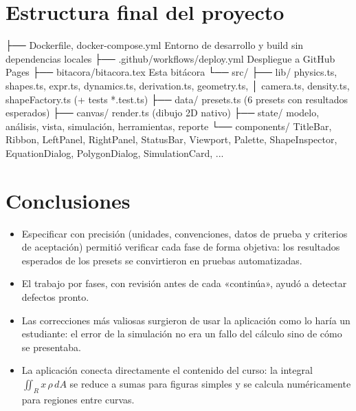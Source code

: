 \documentclass[11pt,a4paper]{article}
\begin{document}
\section{Estructura final del proyecto}
\begin{Prompt}
├── Dockerfile, docker-compose.yml     Entorno de desarrollo y build sin dependencias locales
├── .github/workflows/deploy.yml       Despliegue a GitHub Pages
├── bitacora/bitacora.tex              Esta bitácora
└── src/
    ├── lib/        physics.ts, shapes.ts, expr.ts, dynamics.ts, derivation.ts, geometry.ts,
    │               camera.ts, density.ts, shapeFactory.ts (+ tests *.test.ts)
    ├── data/       presets.ts (6 presets con resultados esperados)
    ├── canvas/     render.ts (dibujo 2D nativo)
    ├── state/      modelo, análisis, vista, simulación, herramientas, reporte
    └── components/ TitleBar, Ribbon, LeftPanel, RightPanel, StatusBar, Viewport, Palette,
                    ShapeInspector, EquationDialog, PolygonDialog, SimulationCard, ...
\end{Prompt}

\section{Conclusiones}

\begin{itemize}
  \item Especificar con precisión (unidades, convenciones, datos de prueba y criterios de aceptación)
        permitió verificar cada fase de forma objetiva: los resultados esperados de los presets se
        convirtieron en pruebas automatizadas.
  \item El trabajo por fases, con revisión antes de cada «continúa», ayudó a detectar defectos pronto.
  \item Las correcciones más valiosas surgieron de usar la aplicación como lo haría un estudiante:
        el error de la simulación no era un fallo del cálculo sino de cómo se presentaba.
  \item La aplicación conecta directamente el contenido del curso: la integral
        $\iint_R x\,\rho\,dA$ se reduce a sumas para figuras simples y se calcula numéricamente para
        regiones entre curvas.
\end{itemize}
\end{document}
